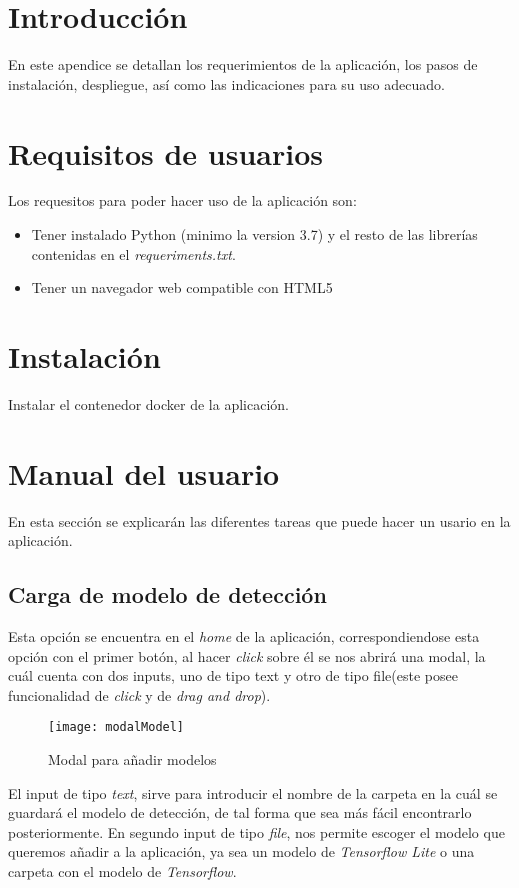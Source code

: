 
\section{Introducción}
En este apendice se detallan los requerimientos de la aplicación, los pasos de instalación, despliegue, así como las indicaciones para su uso adecuado.
\section{Requisitos de usuarios}
Los requesitos para poder hacer uso de la aplicación son:
\begin{itemize}
    \item Tener instalado Python (minimo la version 3.7) y el resto de las librerías contenidas en el \textit{requeriments.txt}.
    \item Tener un navegador web compatible con HTML5 
\end{itemize}

\section{Instalación}
Instalar el contenedor docker de la aplicación.

\section{Manual del usuario}
En esta sección se explicarán las diferentes tareas que puede hacer un usario en la aplicación.
\subsection{Carga de modelo de detección}
Esta opción se encuentra en el \textit{home} de la aplicación, correspondiendose esta opción con el primer botón, al hacer \textit{click} sobre él se nos abrirá una modal, la cuál cuenta con dos inputs, uno de tipo text y otro de tipo file(este posee funcionalidad de \textit{click} y de \textit{drag and drop}).
\begin{figure}[!h]
    \centering
    \texttt{[image: modalModel]}
    \caption{Modal para añadir modelos}\label{fig:modalModel}
\end{figure}
El input de tipo \textit{text}, sirve para introducir el nombre de la carpeta en la cuál se guardará el modelo de detección, de tal forma que sea más fácil encontrarlo posteriormente.
En segundo input de tipo \textit{file}, nos permite escoger el modelo que queremos añadir a la aplicación, ya sea un modelo de \textit{Tensorflow Lite} o una carpeta con el modelo de \textit{Tensorflow}.

